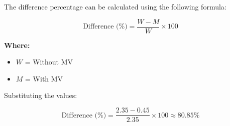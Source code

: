 The difference percentage can be calculated using the following formula:

\begin{equation}
\text{Difference (\%)} = \frac{W - M}{W} \times 100
\end{equation}

\noindent \textbf{Where:}
\begin{itemize}
    \item $W$ = Without MV
    \item $M$ = With MV
\end{itemize}

Substituting the values:

\[
\text{Difference (\%)} = \frac{2.35 - 0.45}{2.35} \times 100 \approx 80.85\%
\]